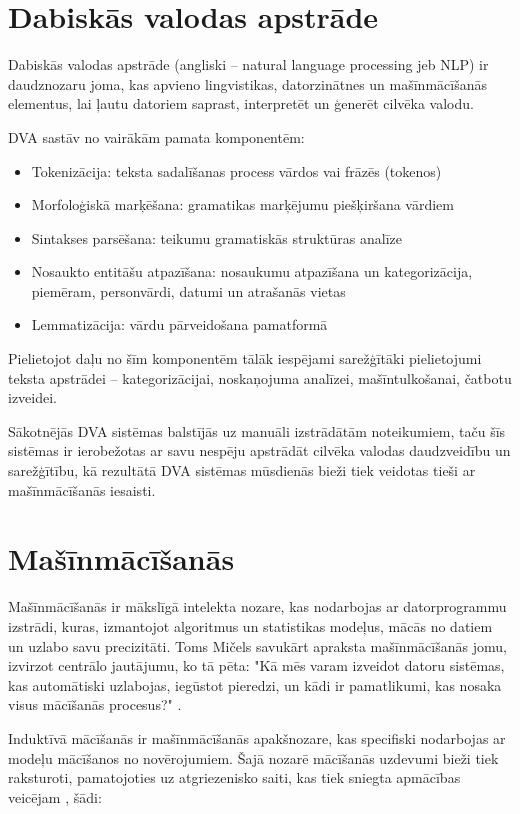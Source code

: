 \section{Dabiskās valodas apstrāde}
Dabiskās valodas apstrāde (angliski – natural language processing jeb NLP) ir daudznozaru joma, kas apvieno lingvistikas, datorzinātnes un mašīnmācīšanās elementus, lai ļautu datoriem saprast, interpretēt un ģenerēt cilvēka valodu. 

DVA sastāv no vairākām pamata komponentēm:
\begin{itemize}
\item Tokenizācija: teksta sadalīšanas process vārdos vai frāzēs (tokenos)
\item Morfoloģiskā marķēšana: gramatikas marķējumu piešķiršana vārdiem
\item Sintakses parsēšana: teikumu gramatiskās struktūras analīze
\item Nosaukto entitāšu atpazīšana: nosaukumu atpazīšana un kategorizācija, piemēram, personvārdi, datumi un atrašanās vietas
\item Lemmatizācija: vārdu pārveidošana pamatformā
\end{itemize}

Pielietojot daļu no šīm komponentēm tālāk iespējami sarežģītāki pielietojumi teksta apstrādei – kategorizācijai, noskaņojuma analīzei, mašīntulkošanai, čatbotu izveidei. 

Sākotnējās DVA sistēmas balstījās uz manuāli izstrādātām noteikumiem, taču šīs sistēmas ir ierobežotas ar savu nespēju apstrādāt cilvēka valodas daudzveidību un sarežģītību, kā rezultātā DVA sistēmas mūsdienās bieži tiek veidotas tieši ar mašīnmācīšanās iesaisti.

\section{Mašīnmācīšanās}
Mašīnmācīšanās ir mākslīgā intelekta nozare, kas nodarbojas ar datorprogrammu izstrādi, kuras, izmantojot algoritmus un statistikas modeļus, mācās no datiem un uzlabo savu precizitāti. Toms Mičels savukārt apraksta mašīnmācīšanās jomu, izvirzot centrālo jautājumu, ko tā pēta: "Kā mēs varam izveidot datoru sistēmas, kas automātiski uzlabojas, iegūstot pieredzi, un kādi ir pamatlikumi, kas nosaka visus mācīšanās procesus?" \cite{definitionML}.

Induktīvā mācīšanās ir mašīnmācīšanās apakšnozare, kas specifiski nodarbojas ar modeļu mācīšanos no novērojumiem. Šajā nozarē mācīšanās uzdevumi bieži tiek raksturoti, pamatojoties uz atgriezenisko saiti, kas tiek sniegta apmācības veicējam \cite{russel2010}, šādi:

